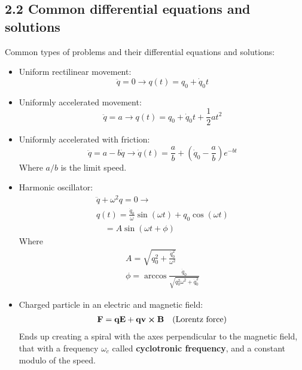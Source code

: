 \documentclass[a4paper,landscape,10pt]{cheatsheet}
\begin{document}
\subsection*{2.2 Common differential equations and solutions}
Common types of problems and their differential equations and solutions:
\begin{itemize}
  \item Uniform rectilinear movement:
        $$
          \ddot{q} = 0 \longrightarrow q(t) = q_0 + \dot{q}_0 t
        $$
  \item Uniformly accelerated movement:
        $$
          \ddot{q} = a \longrightarrow q(t) = q_0 + \dot{q}_0 t + \frac{1}{2}at^2
        $$
  \item Uniformly accelerated with friction:
        $$
          \ddot{q} = a - b\dot{q} \longrightarrow \dot{q}(t) = \frac{a}{b} + \left(\dot{q}_0 - \frac{a}{b}\right)e^{-bt}
        $$
        Where $a/b$ is the limit speed.
  \item Harmonic oscillator:
        \begin{gather*}
          \ddot{q} + \omega^2 q=0 \rightarrow                             \\
          q(t)=\frac{\dot{q}_0}{\omega}\sin(\omega t) + q_0\cos(\omega t) \\
          \quad = A\sin(\omega t+\phi)
        \end{gather*}
        Where
        \begin{gather*}
          A=\sqrt{q^2_0 + \frac{\dot{q}^2_0}{\omega^2}} \\
          \phi = \arccos\frac{\dot{q}_0}{\sqrt{q^2_0\omega^2+\dot{q}^2_0}}
        \end{gather*}
  \item Charged particle in an electric and magnetic field:
        \begin{gather*}
          \bf{F} = q\bf{E}+q\bf{v}\cross\bf{B} \quad\text{(Lorentz force)} \\
        \end{gather*}
        Ends up creating a spiral with the axes perpendicular to the magnetic field, that with a frequency $\omega_c$
        called \textbf{cyclotronic frequency}, and a constant modulo of the speed.
\end{itemize}
\end{document}
